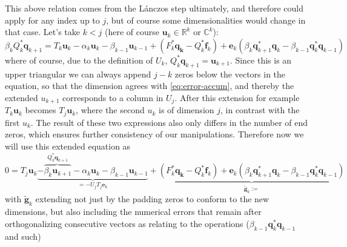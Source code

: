\documentclass{article}
\begin{document}
This above relation comes from the L\'anczos step ultimately, and therefore could apply for any index up to $j$, but of course some dimensionalities would change in that case. Let's take $k<j$ (here of course $\textbf{u}_k \in \mathbb{R}^k$ or $\mathbb{C}^k$):
\begin{equation*}
	\beta_kQ_{k}^{\ast}\mathbf{q}_{k+1}=T_{k}\mathbf{u}_k-\alpha_k\mathbf{u}_k-\beta_{k-1}\mathbf{u}_{k-1}+(F_k^{\ast}\mathbf{q_k}-Q_k^{\ast}\mathbf{f}_k)+\mathbf{e}_k(\beta_{k}\mathbf{q}_{k+1}^{\ast}\mathbf{q}_{k}-\beta_{k-1}\mathbf{q}_{k}^{\ast}\mathbf{q}_{k-1})
\end{equation*}
where of course, due to the definition of $U_k$, $Q_{k}^{\ast}\mathbf{q}_{k+1} = \textbf{u}_{k+1}$. Since this is an upper triangular we can always append $j-k$ zeros below the vectors in the equation, so that the dimension agrees with \autoref{eq:error-accum}, and thereby the extended $u_{k+1} $ corresponds to a column in $U_j$. After this extension for example $T_{k}\mathbf{u}_k$ becomes $T_{j}\mathbf{u}_k$, where the second $u_k$ is of dimension $j$, in contrast with the first $u_k$. The result of these two expressions also only differs in the number of end zeros, which ensures further consistency of our manipulations. Therefore now we will use this extended equation as 
\begin{equation}\label{eq:inbetween-error-accum}
	0 =T_{j}\mathbf{u}_k\underbrace{-\overbrace{\beta_k \mathbf{u}_{k+1}}^{Q_{k}^{\ast}\mathbf{q}_{k+1}}-\alpha_k\mathbf{u}_k-\beta_{k-1}\mathbf{u}_{k-1}}_{=-U_j T_j \textbf{e}_k}+\underbrace{(F_k^{\ast}\mathbf{q_k}-Q_k^{\ast}\mathbf{f}_k)+\mathbf{e}_k(\beta_{k}\mathbf{q}_{k+1}^{\ast}\mathbf{q}_{k}-\beta_{k-1}\mathbf{q}_{k}^{\ast}\mathbf{q}_{k-1})}_{\tilde{\textbf{g}}_k := }
\end{equation}
with $\tilde{\textbf{g}}_k$ extending not just by the padding zeros to conform to the new dimensions, but also including the numerical errors that remain after orthogonalizing consecutive vectors as relating to the operations ($\beta_{k-1}\textbf{q}_k^\ast \textbf{q}_{k-1}$ and such)
\end{document}

